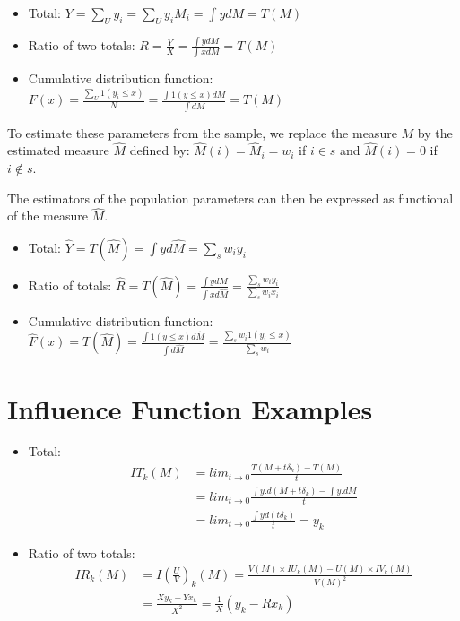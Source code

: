 \documentclass[]{book}
\theoremstyle{definition}
\theoremstyle{definition}
\theoremstyle{remark}
\begin{document}
\begin{itemize}
\item
  Total: \(Y=\sum_Uy_i=\sum_U y_iM_i=\int ydM=T(M)\)
\item
  Ratio of two totals:
  \(R=\frac{Y}{X}=\frac{\int y dM}{\int x dM}=T(M)\)
\item
  Cumulative distribution function:
  \(F(x)=\frac{\sum_U 1(y_i\leq x)}{N}=\frac{\int 1(y\leq x)dM}{\int{dM}}=T(M)\)
\end{itemize}

To estimate these parameters from the sample, we replace the measure
\(M\) by the estimated measure \(\hat{M}\) defined by:
\(\hat{M}(i)=\hat{M}_i= w_i\) if \(i\in s\) and \(\hat{M}(i)=0\) if
\(i\notin s\).

The estimators of the population parameters can then be expressed as
functional of the measure \(\hat{M}\).

\begin{itemize}
\item
  Total: \(\hat{Y}=T(\hat{M})=\int yd\hat{M}=\sum_s w_iy_i\)
\item
  Ratio of totals:
  \(\hat{R}=T(\hat{M})=\frac{\int y d\hat{M}}{\int x d\hat{M}}=\frac{\sum_s w_iy_i}{\sum_s w_ix_i}\)
\item
  Cumulative distribution function:
  \(\hat{F}(x)=T(\hat{M})=\frac{\int 1(y\leq x)d\hat{M}}{\int{d\hat{M}}}=\frac{\sum_s w_i 1(y_i\leq x)}{\sum_s w_i}\)
\end{itemize}

\section{Influence Function Examples}\label{influence-function-examples}

\begin{itemize}
\item
  Total: \[
  \begin{aligned}
  IT_k(M)&=lim_{t\rightarrow 0}\frac{T(M+t\delta_k)-T(M)}{t}\\
  &=lim_{t\rightarrow 0}\frac{\int y.d(M+t\delta_k)-\int y.dM}{t}\\
  &=lim_{t\rightarrow 0}\frac{\int yd(t\delta_k)}{t}=y_k  
  \end{aligned}
  \]
\item
  Ratio of two totals: \[
  \begin{aligned}
  IR_k(M)&=I\left(\frac{U}{V}\right)_k(M)=\frac{V(M)\times IU_k(M)-U(M)\times IV_k(M)}{V(M)^2}\\
  &=\frac{X y_k-Y x_k}{X^2}=\frac{1}{X}(y_k-Rx_k)
  \end{aligned}
  \]
\end{itemize}
\end{document}
